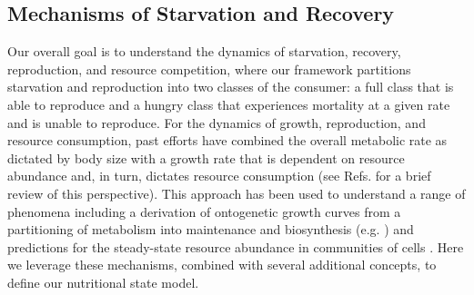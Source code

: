 \documentclass{pnastwo}
\begin{document}
\begin{article}

\section*{Mechanisms of Starvation and Recovery}
Our overall goal is to understand the dynamics of starvation, recovery, reproduction, and resource competition, where our framework partitions starvation and reproduction into two classes of the consumer: a full class that is able to reproduce and a hungry class that experiences mortality at a given rate and is unable to reproduce. For the dynamics of growth, reproduction, and resource consumption, past efforts have combined the overall metabolic rate as dictated by body size with a growth rate that is dependent on resource abundance and, in turn, dictates resource consumption (see Refs. \cite{Kempes:2012hy,kempes2014morphological} for a brief review of this perspective). This approach has been used to understand a range of phenomena including a derivation of ontogenetic growth curves from a partitioning of metabolism into maintenance and biosynthesis (e.g. \cite{West:2001bv,moses2008rmo,hou,Kempes:2012hy}) and predictions for the steady-state resource abundance in communities of cells \cite{kempes2014morphological}. Here we leverage these mechanisms, combined with several additional concepts, to define our nutritional state model.


\end{article}
\end{document}
